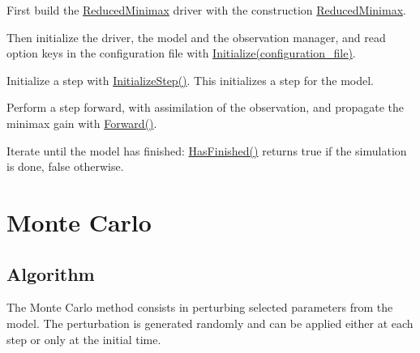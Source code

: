 \documentclass{tufte-book}
\begin{document}
\begin{DoxyEnumerate}
\item \-First build the {\ttfamily  \hyperlink{class_verdandi_1_1_reduced_minimax}{\-Reduced\-Minimax}} driver with the construction {\ttfamily  \hyperlink{class_verdandi_1_1_reduced_minimax_a3348af891e4af2d37f6ffb44ae513210}{\-Reduced\-Minimax}}.


\item \-Then initialize the driver, the model and the observation manager, and read option keys in the configuration file with {\ttfamily  \hyperlink{class_verdandi_1_1_reduced_minimax_a36393b2be9a1c0abf3d005b84ee8bd3e}{\-Initialize(configuration\-\_\-file)}}.


\item \-Initialize a step with {\ttfamily  \hyperlink{class_verdandi_1_1_reduced_minimax_af7af2afae2e9698bfaae48d71b9ae571}{\-Initialize\-Step()}}. \-This initializes a step for the model.


\item \-Perform a step forward, with assimilation of the observation, and propagate the minimax gain with {\ttfamily  \hyperlink{class_verdandi_1_1_reduced_minimax_a769b32003ad3a1886ee50bb1c07888fb}{\-Forward()}}.


\item \-Iterate until the model has finished\-: {\ttfamily  \hyperlink{class_verdandi_1_1_reduced_minimax_adc80ca802a589f2ab15f65010b4842e6}{\-Has\-Finished()}} returns true if the simulation is done, false otherwise.
\end{DoxyEnumerate}




 \hypertarget{monte_carlo_mc}{}\section{\-Monte Carlo}\label{monte_carlo}


\hypertarget{monte_carlo_mc_algorithm}{}\subsection{\-Algorithm}\label{monte_carlo_mc_algorithm}

\-The \-Monte \-Carlo method consists in perturbing selected parameters from the model. \-The perturbation is generated randomly and can be applied either at each step or only at the initial time. \par
\end{document}
